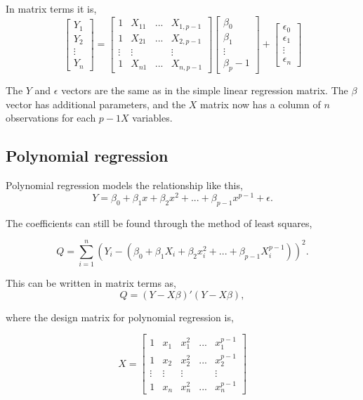 	In matrix terms it is,  
	$$
	\left[
	\begin{array}{c}
		Y_1 \\ 
		Y_2 \\ 
		\vdots \\
		Y_n 
	\end{array}
	\right]
	=
	\left[
	\begin{array}{cccc}
		1 & X_{11} & ... & X_{1, p-1} \\ 
		1 & X_{21} & ... & X_{2, p-1} \\ 
		\vdots & \vdots &  & \vdots \\
		1 & X_{n1} & ... & X_{n, p-1}
	\end{array}
	\right]
	\left[
	\begin{array}{c}
		\beta_0 \\ 
		\beta_1 \\
		\vdots \\
		\beta_p-1 
	\end{array}
	\right]
	+
	\left[
	\begin{array}{c}
		\epsilon_0 \\ 
		\epsilon_1 \\
		\vdots \\
		\epsilon_n 
	\end{array}
	\right]
	$$
	
	The $Y$ and $\epsilon$ vectors are the same as in the simple linear regression matrix. The $\beta$ vector has additional parameters, and the $X$ matrix now has a column of $n$ observations for each $p-1 X$ variables. \newline 
	
	\subsection{Polynomial regression}
	Polynomial regression models the relationship like this, 
	$$Y=\beta_0 + \beta_1 x + \beta_2 x^2	+ ... + \beta_{p-1} x^{p-1}+ \epsilon.$$
	
	The coefficients can still be found through the method of least squares,
	
	$$Q=\sum_{i=1}^{n}(Y_i -(\beta_0 + \beta_1 X_i + \beta_2 x_i^2 + ... + \beta_{p-1}X_{i}^{p-1}))^2.$$
	\newline
	
	This can be written in matrix terms as,
	$$Q=(Y-X\beta)' (Y-X\beta),$$
	
	where the design matrix for polynomial regression is, 
	
	$$ X=
	\left[
	\begin{array}{ccccc}
		1&x_1&x_1^2&...&x_1^{p-1}\\ 
		1&x_2&x_2^2&...&x_2^{p-1} \\
		\vdots & \vdots &\vdots &&\vdots\\
		1&x_n&x_n^2&...&x_n^{p-1} 
	\end{array}
	\right]
	$$
	
